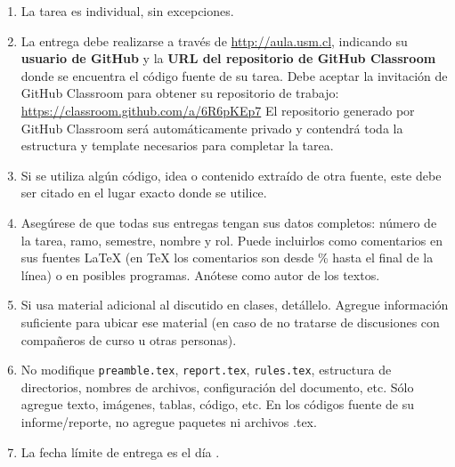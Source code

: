 \begin{enumerate}[(1)]
  \item La tarea es individual, sin excepciones.

  \item La entrega debe realizarse a través de \url{http://aula.usm.cl}, indicando su \textbf{usuario de GitHub} y la \textbf{URL del repositorio de GitHub Classroom} donde se encuentra el código fuente de su tarea.
  Debe aceptar la invitación de GitHub Classroom para obtener su repositorio de trabajo:  
  \url{https://classroom.github.com/a/6R6pKEp7}  
  El repositorio generado por GitHub Classroom será automáticamente privado y contendrá toda la estructura y template necesarios para completar la tarea.

  \item Si se utiliza algún código, idea o contenido extraído de otra fuente, este debe ser citado en el lugar exacto donde se utilice.

  \item Asegúrese de que todas sus entregas tengan sus datos completos: número de la tarea, ramo, semestre, nombre y rol. Puede incluirlos como comentarios en sus fuentes \LaTeX{} (en \TeX{} los comentarios son desde \% hasta el final de la línea) o en posibles programas. Anótese como autor de los textos.

  \item Si usa material adicional al discutido en clases, detállelo. Agregue información suficiente para ubicar ese material (en caso de no tratarse de discusiones con compañeros de curso u otras personas).

  \item No modifique \texttt{preamble.tex}, \texttt{report.tex}, \texttt{rules.tex}, estructura de directorios, nombres de archivos, configuración del documento, etc. Sólo agregue texto, imágenes, tablas, código, etc. En los códigos fuente de su informe/reporte, no agregue paquetes ni archivos .tex.

  \item La fecha límite de entrega es el día \tcm{\deadline}.
\end{enumerate}
